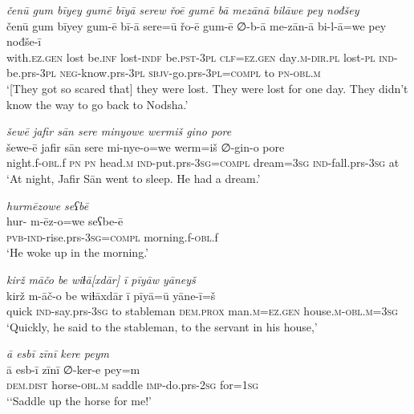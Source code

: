 \ea \label{ŠJ.39}
\textit{čenū gum bīyey gumē bīyā serew řoē gumē bā mezānā bilāwe pey nođšey} \\ 
\gll čenū gum bīyey gum-ē bī-ā sere=ū řo-ē gum-ē ∅-b-ā me-zān-ā bi-l-ā=we pey nođše-ī \\ 
 with\textsc{.ez.gen} lost be\textsc{.inf} lost\textsc{-indf} be\textsc{.pst}\textsc{-3pl} \textsc{clf}\textsc{=ez.gen} day\textsc{.m}\textsc{-dir}\textsc{.pl} lost\textsc{\textsc{-pl}} \textsc{ind-}be.prs\textsc{-3pl} \textsc{neg-}know.prs\textsc{-3pl} \textsc{sbjv-}go.prs\textsc{-3pl}\textsc{=compl} to \textsc{pn}\textsc{-obl}\textsc{.m} \\ 
\glt `[They got so scared that] they were lost. They were lost for one day. They didn’t know the way to go back to Nodsha.'
\z 
 
\ea \label{ŠJ.46}
\textit{šewē jafir sān sere minyowe wermiš gino pore} \\ 
\gll šewe-ē jafir sān sere mi-nye-o=we werm=iš ∅-gin-o pore \\ 
 night.f\textsc{-obl}.f \textsc{pn} \textsc{pn} head\textsc{.m} \textsc{ind-}put.prs\textsc{-3sg}\textsc{=compl} dream\textsc{=3sg} \textsc{ind-}fall.prs\textsc{-3sg} at \\ 
\glt `At night, Jafir Sān went to sleep. He had a dream.'
\z 
 
\ea \label{ŠJ.47}
\textit{hurmēzowe seʕbē} \\ 
\gll hur- m-ēz-o=we seʕbe-ē \\ 
 \textsc{pvb-}\textsc{ind-}rise.prs\textsc{-3sg}\textsc{=compl} morning.f\textsc{-obl}.f \\ 
\glt `He woke up in the morning.'
\z 
 
\ea \label{ŠJ.51}
\textit{kirž māčo be wiɫā[xdār] ī pīyāw yāneyš} \\ 
\gll kirž m-āč-o be wiɫāxdār ī pīyā=ū yāne-ī=š \\ 
 quick \textsc{ind-}say.prs\textsc{-3sg} to stableman \textsc{dem.prox} man\textsc{.m}\textsc{=ez.gen} house\textsc{.m}\textsc{-obl}\textsc{.m}\textsc{=3sg} \\ 
\glt `Quickly, he said to the stableman, to the servant in his house,'
\z 
 
\ea \label{ŠJ.52}
\textit{ā esbī zīnī kere peym} \\ 
\gll ā esb-ī zīnī ∅-ker-e pey=m \\ 
 \textsc{dem.dist} horse\textsc{-obl}\textsc{.m} saddle \textsc{imp-}do.prs-\textsc{2sg} for\textsc{=\textsc{1sg}} \\ 
\glt `‘Saddle up the horse for me!'
\z 
 

